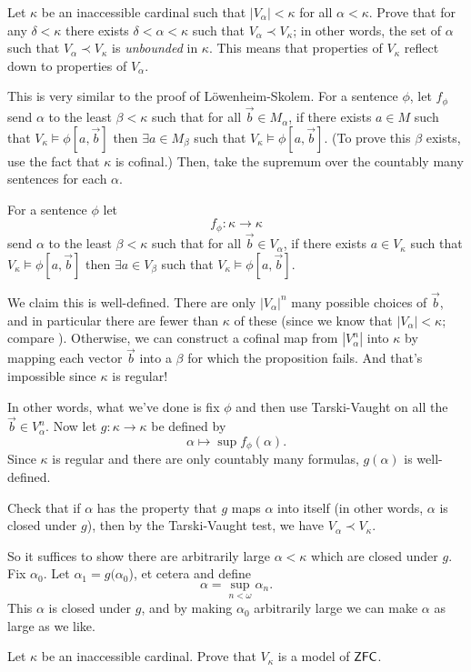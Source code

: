 \begin{dproblem}[Reflection]
	\gim
	Let $\kappa$ be an inaccessible cardinal such that $|V_\alpha| < \kappa$ for all $\alpha < \kappa$.
	Prove that for any $\delta < \kappa$ there exists $\delta < \alpha < \kappa$
	such that $V_\alpha \prec V_\kappa$; in other words,
	the set of $\alpha$ such that $V_\alpha \prec V_\kappa$ is \emph{unbounded} in $\kappa$.
	This means that properties of $V_\kappa$ reflect down to properties of $V_\alpha$.
	\begin{hint}
		This is very similar to the proof of L\"owenheim-Skolem.
		For a sentence $\phi$, let $f_\phi$
		send $\alpha$ to the least $\beta < \kappa$ such that for all $\vec b \in M_\alpha$, if there exists $a \in M$ such that $V_\kappa \vDash \phi[a, \vec b]$ then $\exists a \in M_\beta$ such that $V_\kappa \vDash \phi[a, \vec b]$.
		(To prove this $\beta$ exists, use the fact that $\kappa$ is cofinal.)
		Then, take the supremum over the countably many sentences for each $\alpha$.
	\end{hint}
	\begin{sol}
		For a sentence $\phi$ let \[ f_\phi : \kappa \to \kappa \]
		send $\alpha$ to the least $\beta < \kappa$ such that for all $\vec b \in V_\alpha$, if there exists $a \in V_\kappa$ such that $V_\kappa \vDash \phi[a, \vec b]$ then $\exists a \in V_\beta$ such that $V_\kappa \vDash \phi[a, \vec b]$.

		We claim this is well-defined.
		There are only $\left\lvert V_\alpha \right\rvert^n$ many possible choices of $\vec b$,
		and in particular there are fewer than $\kappa$ of these
		(since we know that $\left\lvert V_\alpha \right\rvert < \kappa$; compare ).
		Otherwise, we can construct a cofinal map from $\left\lvert V_\alpha^n \right\rvert$ 
		into $\kappa$ by mapping each vector $\vec b$ into a $\beta$ for which the proposition fails.
		And that's impossible since $\kappa$ is regular!

		In other words, what we've done is fix $\phi$ and then use Tarski-Vaught on all the $\vec b \in V_\alpha^n$.
		Now let $g : \kappa \to \kappa$ be defined by
		\[ \alpha \mapsto \sup f_\phi(\alpha). \]
		Since $\kappa$ is regular and there are only countably many formulas, $g(\alpha)$ is well-defined.

		Check that if $\alpha$ has the property that $g$ maps $\alpha$ into itself (in other words, $\alpha$ is closed under $g$), then by the Tarski-Vaught test, we have $V_\alpha \prec V_\kappa$.

		So it suffices to show there are arbitrarily large $\alpha < \kappa$ which are closed under $g$.
		Fix $\alpha_0$. Let $\alpha_1 = g(\alpha_0$), et cetera and define
		\[ \alpha = \sup_{n < \omega} \alpha_n. \]
		This $\alpha$ is closed under $g$, and by making $\alpha_0$ arbitrarily large we can make $\alpha$ as large as we like.
	\end{sol}
\end{dproblem}

\begin{sproblem}
	\label{prob:inaccessible_model}
	\gim
	Let $\kappa$ be an inaccessible cardinal.
	Prove that $V_\kappa$ is a model of $\mathsf{ZFC}$.
\end{sproblem}
